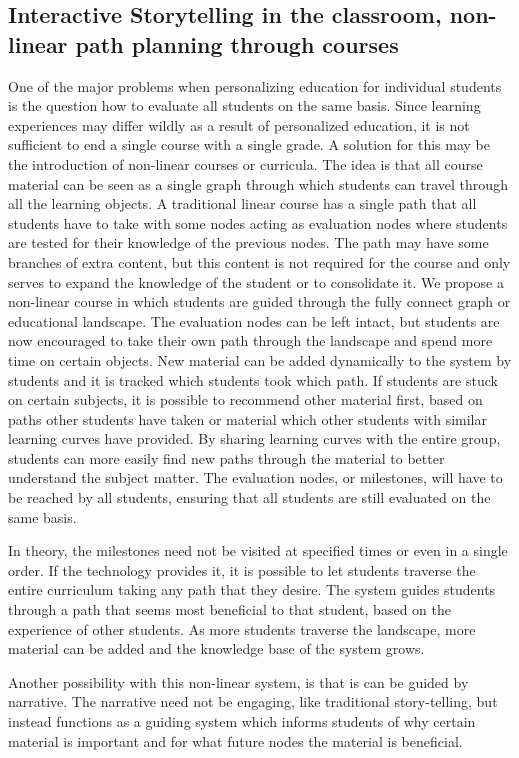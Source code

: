 \documentclass[11pt]{article}
\begin{document}
\subsection{Interactive Storytelling in the classroom, non-linear path planning through courses}
One of the major problems when personalizing education for individual students is the question how to evaluate all students on the same basis. Since learning experiences may differ wildly as a result of personalized education, it is not sufficient to end a single course with a single grade. A solution for this may be the introduction of non-linear courses or curricula. The idea is that all course material can be seen as a single graph through which students can travel through all the learning objects. A traditional linear course has a single path that all students have to take with some nodes acting as evaluation nodes where students are tested for their knowledge of the previous nodes. The path may have some branches of extra content, but this content is not required for the course and only serves to expand the knowledge of the student or to consolidate it. We propose a non-linear course in which students are guided through the fully connect graph or educational landscape. The evaluation nodes can be left 
intact, but students are now encouraged to take their own path through the landscape and spend more time on certain objects. New material can be added dynamically to the system by students and it is tracked which students took which path. If students are stuck on certain subjects, it is possible to recommend other material first, based on paths other students have taken or material which other students with similar learning curves have provided. By sharing learning curves with the entire group, students can more easily find new paths through the material to better understand the subject matter. The evaluation nodes, or milestones, will have to be reached by all students, ensuring that all students are still evaluated on the same basis. 

In theory, the milestones need not be visited at specified times or even in a single order. If the technology provides it, it is possible to let students traverse the entire curriculum taking any path that they desire. The system guides students through a path that seems most beneficial to that student, based on the experience of other students. As more students traverse the landscape, more material can be added and the knowledge base of the system grows.

Another possibility with this non-linear system, is that is can be guided by narrative. The narrative need not be engaging, like traditional story-telling, but instead functions as a guiding system which informs students of why certain material is important and for what future nodes the material is beneficial. 
\end{document}
